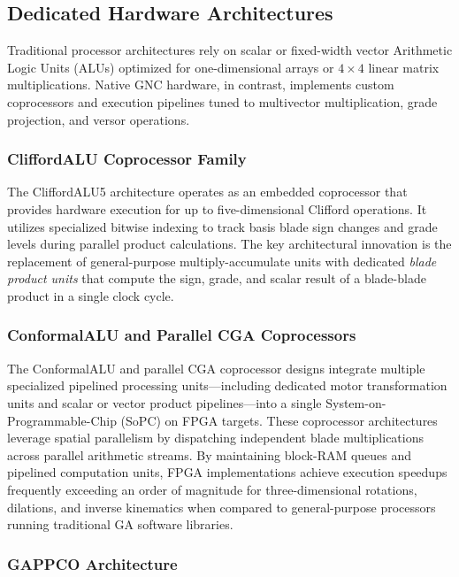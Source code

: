 \documentclass[manuscript, nonacm, review=false]{acmart}
\theoremstyle{definition}
\theoremstyle{plain}
\begin{document}
\subsection{Dedicated Hardware Architectures}
\label{subsec:dedicated_hardware}

Traditional processor architectures rely on scalar or fixed-width vector Arithmetic Logic Units (ALUs) optimized for one-dimensional arrays or $4 \times 4$ linear matrix multiplications. Native GNC hardware, in contrast, implements custom coprocessors and execution pipelines tuned to multivector multiplication, grade projection, and versor operations.

\subsubsection{CliffordALU Coprocessor Family}

The CliffordALU5 architecture operates as an embedded coprocessor that provides hardware execution for up to five-dimensional Clifford operations. It utilizes specialized bitwise indexing to track basis blade sign changes and grade levels during parallel product calculations. The key architectural innovation is the replacement of general-purpose multiply-accumulate units with dedicated \emph{blade product units} that compute the sign, grade, and scalar result of a blade-blade product in a single clock cycle.

\subsubsection{ConformalALU and Parallel CGA Coprocessors}

The ConformalALU and parallel CGA coprocessor designs integrate multiple specialized pipelined processing units---including dedicated motor transformation units and scalar or vector product pipelines---into a single System-on-Programmable-Chip (SoPC) on FPGA targets. These coprocessor architectures leverage spatial parallelism by dispatching independent blade multiplications across parallel arithmetic streams. By maintaining block-RAM queues and pipelined computation units, FPGA implementations achieve execution speedups frequently exceeding an order of magnitude for three-dimensional rotations, dilations, and inverse kinematics when compared to general-purpose processors running traditional GA software libraries.

\subsubsection{GAPPCO Architecture}
\end{document}
